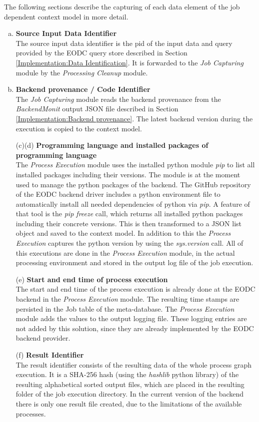 \documentclass[draft,final]{vutinfth} %
\begin{document}
The following sections describe the capturing of each data element of the job dependent context model in more detail.
\begin{enumerate}[(a)]
\item \textbf{Source Input Data Identifier} \\
	The source input data identifier is the pid of the input data and query provided by the EODC query store described in Section \ref{Implementation:Data Identification}. It is forwarded to the \textit{Job Capturing} module by the \textit{Processing Cleanup} module. 

\item \textbf{Backend provenance / Code Identifier} \\
	The \textit{Job Capturing} module reads the backend provenance from the \textit{BackendMonit} output JSON file described in Section \ref{Implementation:Backend provenance}. The latest backend version during the execution is copied to the context model.

\item[(c)(d)] \textbf{Programming language and  installed packages of programming language} \\
	The \textit{Process Execution} module uses the installed python module \textit{pip} to list all installed packages including their versions. The module is at the moment used to manage the python packages of the backend. The GitHub repository of the EODC backend driver includes a python environment file to automatically install all needed dependencies of python via \textit{pip}. A feature of that tool is the \textit{pip freeze} call, which returns all installed python packages including their concrete versions. This is then transformed to a JSON list object and saved to the context model. In addition to this the \textit{Process Execution} captures the python version by using the \textit{sys.version} call. All of this executions are done in the \textit{Process Execution} module, in the actual processing environment and stored in the output log file of the job execution.    

\item[(e)] \textbf{Start and end time of process execution} \\
	The start and end time of the process execution is already done at the EODC backend in the  \textit{Process Execution} module. The resulting time stamps are persisted in the Job table of the meta-database. The \textit{Process Execution} module adds the values to the output logging file. These logging entries are not added by this solution, since they are already implemented by the EODC backend provider.  

\item[(f)] \textbf{Result Identifier} \\
	The result identifier consists of the resulting data of the whole process graph execution. It is a SHA-256 hash (using the \textit{hashlib} python library) of the resulting alphabetical sorted output files, which are placed in the resulting folder of the job execution directory. In the current version of the backend there is only one result file created, due to the limitations of the available processes.  
\end{enumerate}
\end{document}
